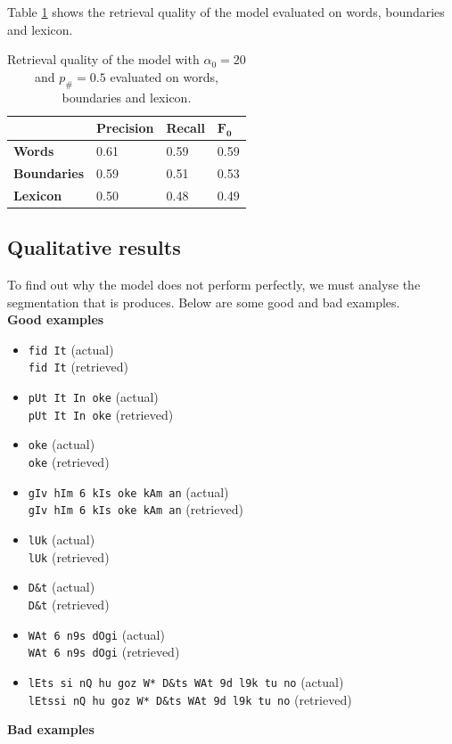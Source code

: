 \begin{multicols}{2}

Table \ref{tab:model_params} shows the retrieval quality of the model evaluated on words, boundaries and lexicon.

\begin{table}[]
\centering
\caption{Retrieval quality of the model with $\alpha_0 = 20$ and $p_\# = 0.5$ evaluated on words, boundaries and lexicon.}
\label{tab:model_params}
\begin{tabular}{llll}
\hline
                    & \textbf{Precision} & \textbf{Recall} & {$\mathbf{F_0}$} \\ \hline
\textbf{Words}      & 0.61               & 0.59            & 0.59          \\
\textbf{Boundaries} & 0.59               & 0.51            & 0.53          \\
\textbf{Lexicon}    & 0.50               & 0.48            & 0.49          \\ \hline
\end{tabular}
\end{table}


\subsection{Qualitative results}

To find out why the model does not perform perfectly, we must analyse the segmentation that is produces. Below are some good and bad examples.\\


\noindent\textbf{Good examples}

\begin{itemize}
\item \texttt{fid It} (actual)\\ \texttt{fid It} (retrieved)
\item \texttt{pUt It In oke} (actual)\\ \texttt{pUt It In oke} (retrieved)
\item \texttt{oke} (actual)\\ \texttt{oke} (retrieved)
\item \texttt{gIv hIm 6 kIs oke kAm an} (actual)\\ \texttt{gIv hIm 6 kIs oke kAm an} (retrieved)
\item \texttt{lUk} (actual)\\ \texttt{lUk} (retrieved)
\item \texttt{D\&t} (actual)\\ \texttt{D\&t} (retrieved)
\item \texttt{WAt 6 n9s dOgi} (actual)\\ \texttt{WAt 6 n9s dOgi} (retrieved)
\item \texttt{lEts si nQ hu goz W* D\&ts WAt 9d l9k tu no} (actual)\\ \texttt{lEtssi nQ hu goz W* D\&ts WAt 9d l9k tu no} (retrieved)
\end{itemize}
\vfill
\noindent\textbf{Bad examples}


\end{multicols}
